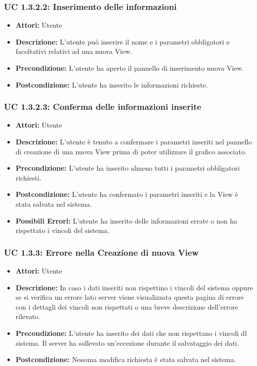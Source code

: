 \subsubsection{UC 1.3.2.2: Inserimento delle informazioni}

\begin{itemize}
    \item \textbf{Attori:} Utente
    \item \textbf{Descrizione:} L'utente può inserire il nome e i parametri obbligatori e facoltativi relativi ad una nuova View.
    \item \textbf{Precondizione:} L'utente ha aperto il pannello di inserimento nuova View.
    \item \textbf{Postcondizione:} L'utente ha inserito le informazioni richieste.
\end{itemize}

\subsubsection{UC 1.3.2.3: Conferma delle informazioni inserite}

\begin{itemize}
    \item \textbf{Attori:} Utente
    \item \textbf{Descrizione:} L'utente è tenuto a confermare i parametri inseriti nel pannello di creazione di una nuova View prima di poter utilizzare il grafico associato.
    \item \textbf{Precondizione:} L'utente ha inserito almeno tutti i parametri obbligatori richiesti.
    \item \textbf{Postcondizione:} L'utente ha confermato i parametri inseriti e la View è stata salvata nel sistema.
    \item \textbf{Possibili Errori:} L'utente ha inserito delle informazioni errate o non ha rispettato i vincoli del sistema.
\end{itemize}

\subsubsection{UC 1.3.3: Errore nella Creazione di nuova View}

\begin{itemize}
    \item \textbf{Attori:} Utente
    \item \textbf{Descrizione:} In caso i dati inseriti non rispettino i vincoli del sistema oppure se si verifica un errore lato server viene visualizzata questa pagina di errore con i dettagli dei vincoli non rispettati o una breve descrizione dell'errore rilevato.
    \item \textbf{Precondizione:} L'utente ha inserito dei dati che non rispettano i vincoli dl sistema. Il server ha sollevato un'eccezione durante il salvataggio dei dati.
    \item \textbf{Postcondizione:} Nessuna modifica richiesta è stata salvata nel sistema.
\end{itemize}

